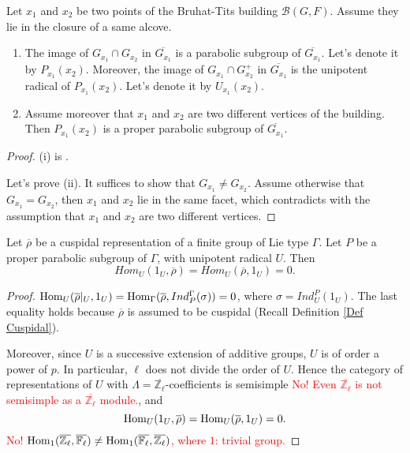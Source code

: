 	
	\begin{lemma}\label{Lem Passage to Residue Field}
		Let $x_1$ and $x_2$ be two points of the Bruhat-Tits building $\mathcal{B}(G, F)$. Assume they lie in the closure of a same alcove.
		\begin{enumerate}
			\item[(i)]   The image of $G_{x_1} \cap G_{x_2}$ in $\overline{G_{x_1}}$ is a parabolic subgroup of $\overline{G_{x_1}}$. Let's denote it by $P_{x_1}(x_2)$. Moreover, the image of $G_{x_1} \cap G_{x_2}^+$ in $\overline{G_{x_1}}$ is the unipotent radical of $P_{x_1}(x_2)$. Let's denote it by $U_{x_1}(x_2)$.
			\item[(ii)] 	Assume moreover that $x_1$ and $x_2$ are two different vertices of the building. Then $P_{x_1}(x_2)$ is a proper parabolic subgroup of $\overline{G_{x_1}}$.
		\end{enumerate}
	\end{lemma}
	
	\begin{proof}
		(i) is \cite[II.5.1.(k)]{vigneras1996representations}.
		
		Let's prove (ii). It suffices to show that $G_{x_1} \neq G_{x_2}$. Assume otherwise that $G_{x_1}=G_{x_2}$, then $x_1$ and $x_2$ lie in the same facet, which contradicts with the assumption that $x_1$ and $x_2$ are two different vertices.
	\end{proof}
	
	\begin{lemma}\label{Lem Hom_U(1_U, cusp)}
		Let $\overline{\rho}$ be a cuspidal representation of a finite group of Lie type $\Gamma$. Let $P$ be a proper parabolic subgroup of $\Gamma$, with unipotent radical $U$. Then
		$$Hom_U(1_U, \overline{\rho})=Hom_U(\overline{\rho}, 1_U)=0.$$
	\end{lemma}
	
	\begin{proof}
		$\operatorname{\operatorname{Hom}}_U(\overline{\rho}|_U, 1_U)=\operatorname{\operatorname{Hom}}_{\Gamma}(\overline{\rho}, Ind_P^{\Gamma}(\sigma))=0$, where $\sigma=Ind_U^P(1_U)$. The last equality holds because $\overline{\rho}$ is assumed to be cuspidal (Recall Definition \ref{Def Cuspidal}). 
		
		Moreover, since $U$ is a successive extension of additive groups, $U$ is of order a power of $p$. In particular, $\ell$ does not divide the order of $U$. Hence the category of representations of $U$ with $\Lambda=\overline{\mathbb{Z}_{\ell}}$-coefficients is semisimple \textcolor{red}{No! Even $\overline{\mathbb{Z}_{\ell}}$ is not semisimple as a $\overline{\mathbb{Z}_{\ell}}$ module.}, and
		$$\operatorname{\operatorname{Hom}}_U(1_U, \overline{\rho})=\operatorname{\operatorname{Hom}}_U(\overline{\rho}, 1_U)=0.$$
		\textcolor{red}{No! $\operatorname{\operatorname{Hom}}_1(\overline{\mathbb{Z}_\ell}, \overline{\mathbb{F}_{\ell}}) \neq \operatorname{\operatorname{Hom}}_1(\overline{\mathbb{F}_{\ell}}, \overline{\mathbb{Z}_{\ell}})$, where $1$: trivial group.}
	\end{proof}
	
